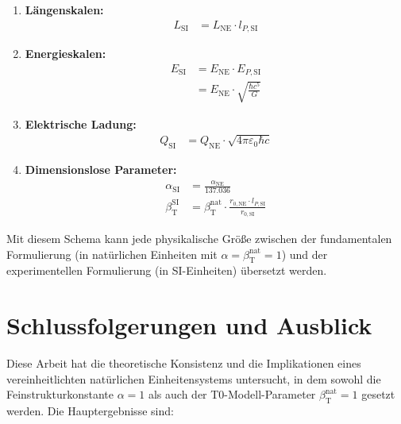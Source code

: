 \documentclass[12pt,a4paper]{article}
\newcommand{\betaT}{\beta_{\text{T}}}
\begin{document}
	\begin{tcolorbox}[colback=blue!5!white,colframe=blue!75!black,title=Umrechnungsschema für natürliche und SI-Einheiten]
		\begin{enumerate}
			\item \textbf{Längenskalen:}
			\begin{align}
				L_{\text{SI}} &= L_{\text{NE}} \cdot l_{P,\text{SI}}
			\end{align}
			\item \textbf{Energieskalen:}
			\begin{align}
				E_{\text{SI}} &= E_{\text{NE}} \cdot E_{P,\text{SI}} \\
				&= E_{\text{NE}} \cdot \sqrt{\frac{\hbar c^5}{G}}
			\end{align}
			\item \textbf{Elektrische Ladung:}
			\begin{align}
				Q_{\text{SI}} &= Q_{\text{NE}} \cdot \sqrt{4\pi\varepsilon_0 \hbar c}
			\end{align}
			\item \textbf{Dimensionslose Parameter:}
			\begin{align}
				\alpha_{\text{SI}} &= \frac{\alpha_{\text{NE}}}{137.036} \\
				\betaT^{\text{SI}} &= \betaT^{\text{nat}} \cdot \frac{r_{0,\text{NE}} \cdot l_{P,\text{SI}}}{r_{0,\text{SI}}}
			\end{align}
		\end{enumerate}
	\end{tcolorbox}
	
	Mit diesem Schema kann jede physikalische Größe zwischen der fundamentalen Formulierung (in natürlichen Einheiten mit \(\alpha = \betaT^{\text{nat}} = 1\)) und der experimentellen Formulierung (in SI-Einheiten) übersetzt werden.
	
	\section{Schlussfolgerungen und Ausblick}
	
	Diese Arbeit hat die theoretische Konsistenz und die Implikationen eines vereinheitlichten natürlichen Einheitensystems untersucht, in dem sowohl die Feinstrukturkonstante \(\alpha = 1\) als auch der T0-Modell-Parameter \(\betaT^{\text{nat}} = 1\) gesetzt werden. Die Hauptergebnisse sind:
	
\end{document}
